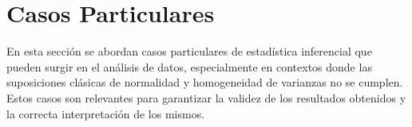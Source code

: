 \section{Casos Particulares}

En esta sección se abordan casos particulares de estadística inferencial que pueden surgir en el análisis de datos, especialmente en contextos donde las suposiciones clásicas de normalidad y homogeneidad de varianzas no se cumplen. Estos casos son relevantes para garantizar la validez de los resultados obtenidos y la correcta interpretación de los mismos.

